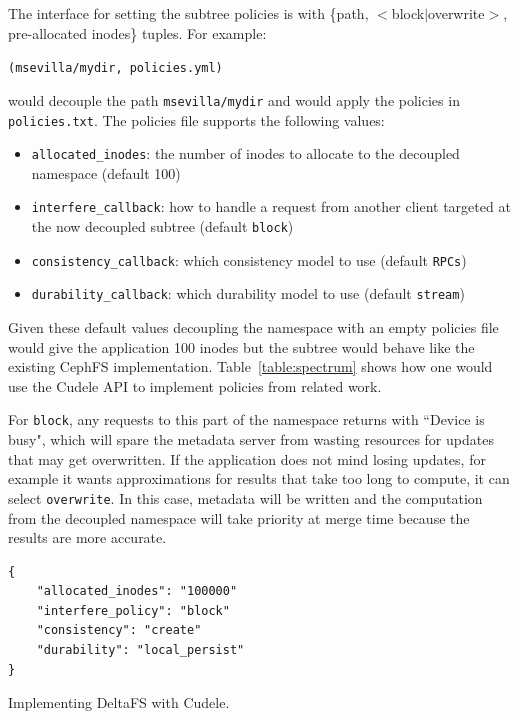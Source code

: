 The interface for setting the subtree policies is with \{path,
\(<\)block\(|\)overwrite\(>\), pre-allocated inodes\} tuples. For example:

\texttt{(msevilla/mydir, policies.yml)}

would decouple the path \texttt{msevilla/mydir} and would apply the policies in
\texttt{policies.txt}. The policies file supports the following values:

\begin{itemize}

  \item \texttt{allocated\_inodes}: the number of inodes to allocate to the
  decoupled namespace (default 100)

  \item \texttt{interfere\_callback}: how to handle a request from another
  client targeted at the now decoupled subtree (default \texttt{block})

  \item \texttt{consistency\_callback}: which consistency model to use (default
  \texttt{RPCs})

  \item \texttt{durability\_callback}: which durability model to use (default
  \texttt{stream})

\end{itemize}

Given these default values decoupling the namespace with an empty policies file
would give the application 100 inodes but the subtree would behave like the
existing CephFS implementation. Table~\ref{table:spectrum} shows how one would use the Cudele
API to implement policies from related work. 


%

For \texttt{block}, any requests to this part of the namespace returns with
``Device is busy", which will spare the metadata server from wasting resources for updates
that may get overwritten. If the application does not mind losing updates, for
example it wants approximations for results that take too long to compute, it
can select \texttt{overwrite}. In this case, metadata will be written and the
computation from the decoupled namespace will take priority at merge time because the results
are more accurate.

\begin{listing}
\begin{verbatim}
{     
    "allocated_inodes": "100000"
    "interfere_policy": "block"
    "consistency": "create"
    "durability": "local_persist"
}
\end{verbatim}
\caption{Implementing DeltaFS with Cudele.}
\label{src:deltafs}
\end{listing}

